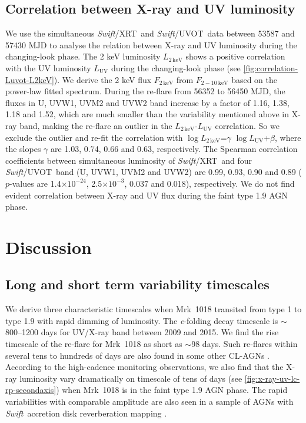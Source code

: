 \documentclass[twocolumn]{aastex63}
\newcommand{\swift}{{\small \it Swift}}
\newcommand{\xrt}{{\small {\it Swift}/XRT}}
\newcommand{\uvot}{{\small {\it Swift}/UVOT}}
\begin{document}
\subsection{Correlation between X-ray and UV luminosity}
\label{subsec:xray-uv}
We use the simultaneous \xrt\, and \uvot\, data between 53587 and 57430 MJD to analyse the relation between X-ray and UV luminosity during the changing-look phase. The 2 keV luminosity $L_\mathrm{{2\,keV}}$ shows a positive correlation with the UV luminosity $L_\mathrm{{UV}}$ during the changing-look phase (see \autoref{fig:correlation-Luvot-L2keV}). We derive the 2 keV flux $F_\mathrm{{2\,keV}}$ from $F_\mathrm{2-10~ keV}$ based on the power-law fitted spectrum.  During the re-flare from 56352 to 56450 MJD, the fluxes in U, UVW1, UVM2 and UVW2 band increase by a factor of 1.16, 1.38, 1.18 and 1.52, which are much smaller than the variability mentioned above in X-ray band, making the re-flare an outlier in the $L_\mathrm{{2\,keV}}$-$L_\mathrm{{UV}}$ correlation. So we exclude the outlier and re-fit the correlation with $\log{L_\mathrm{{2\,keV}}}$=$\gamma$  $\log{L_\mathrm{{UV}}}$+$\beta$, where the slopes $\gamma$ are 1.03, 0.74, 0.66 and 0.63, respectively. The Spearman correlation coefficients between simultaneous luminosity of \xrt\, and four \uvot\, band (U, UVW1, UVM2 and UVW2) are 0.99, 0.93, 0.90 and 0.89 ($p$-values are 1.4$\times10^{-24}$, 2.5$\times10^{-3}$, 0.037 and 0.018), respectively. We do not find evident correlation between X-ray and UV flux during the faint type 1.9 AGN phase.

 




\section{Discussion}\label{sec:discussion}
\subsection{Long and short term variability timescales}
\label{sec:timescale}
We derive three characteristic timescales when Mrk~1018 transited from type 1 to type 1.9 with rapid dimming of luminosity. The \textit{e}-folding decay timescale is $\sim$ 800--1200 days for UV/X-ray band between 2009 and 2015. We find the rise timescale of the re-flare for Mrk~1018 as short as $\sim$98 days. Such re-flares within several tens to hundreds of days are also found in some other CL-AGNs \citep[e.g.][]{2017MNRAS.467.1496O,2020MNRAS.498..718O}. According to the high-cadence monitoring observations, we also find that the X-ray luminosity vary dramatically on timescale of tens of days (see \autoref{fig:x-ray-uv-lc-rp-secondaxis}) when Mrk~1018 is in the faint type 1.9 AGN phase. The rapid variabilities with comparable amplitude are also seen in a sample of AGNs with \swift\, accretion disk reverberation mapping \citep[see][]{2019ApJ...870..123E}. 
\end{document}
